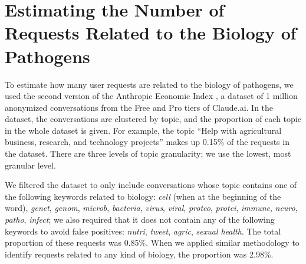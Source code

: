 \documentclass{article}
\theoremstyle{plain}
\theoremstyle{definition}
\theoremstyle{remark}
\begin{document}



\newpage
\appendix

\section{Estimating the Number of Requests Related to the Biology of Pathogens} \label{appendix:estimating-biology-requests}

To estimate how many user requests are related to the biology of pathogens, we used the second version of the Anthropic Economic Index \cite{handa2025economictasksperformedai}, a dataset of 1 million anonymized conversations from the Free and Pro tiers of Claude.ai.
In the dataset, the conversations are clustered by topic, and the proportion of each topic in the whole dataset is given.
For example, the topic ``Help with agricultural business, research, and technology projects'' makes up 0.15\% of the requests in the dataset.
There are three levels of topic granularity; we use the lowest, most granular level.

We filtered the dataset to only include conversations whose topic contains one of the following keywords related to biology: \emph{cell} (when at the beginning of the word), \emph{genet}, \emph{genom}, \emph{microb}, \emph{bacteria}, \emph{virus}, \emph{viral}, \emph{proteo}, \emph{protei}, \emph{immune}, \emph{neuro}, \emph{patho}, \emph{infect}; we also required that it does not contain any of the following keywords to avoid false positives: \emph{nutri}, \emph{tweet}, \emph{agric}, \emph{sexual health}.
The total proportion of these requests was 0.85\%.
When we applied similar methodology to identify requests related to any kind of biology, the proportion was 2.98\%.
\end{document}
